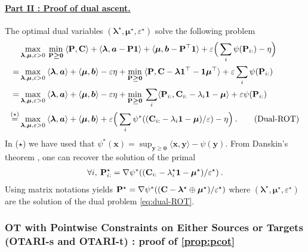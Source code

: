 \paragraph{\underline{Part II : Proof of dual ascent.}}

The optimal dual variables $(\bm{\lambda}^\star, \bm{\mu}^\star, \varepsilon^\star)$ solve the following problem 
\begin{align}
    &\max_{\bm{\lambda}, \bm{\mu}, \varepsilon > 0} \: \min_{{\mathbf{P}} \bm{\geq} \bm{0}} \: \langle {\mathbf{P}}, {\mathbf{C}} \rangle + \langle \bm{\lambda}, \bm{a} - {\mathbf{P}} \bm{1} \rangle + \langle \bm{\mu}, \bm{b} - {\mathbf{P}}^\top \bm{1} \rangle + \varepsilon \Big(\sum_i \psi({\mathbf{P}}_{i:}) - \eta \Big) \\
    = &\max_{\bm{\lambda}, \bm{\mu}, \varepsilon> 0} \: \langle \bm{\lambda}, \bm{a} \rangle + \langle \bm{\mu}, \bm{b} \rangle - \varepsilon \eta + \min_{{\mathbf{P}} \bm{\geq} \bm{0}} \: \langle {\mathbf{P}}, {\mathbf{C}} - \bm{\lambda}\bm{1}^\top - \bm{1}\bm{\mu}^\top \rangle + \varepsilon \sum_i \psi({\mathbf{P}}_{i:}) \\
    = &\max_{\bm{\lambda}, \bm{\mu}, \varepsilon>0} \: \langle \bm{\lambda}, \bm{a} \rangle + \langle \bm{\mu}, \bm{b} \rangle - \varepsilon \eta + \min_{{\mathbf{P}} \bm{\geq} \bm{0}} \: \sum_i \langle {\mathbf{P}}_{i:}, {\mathbf{C}}_{i:} - \lambda_i \bm{1} - \bm{\mu} \rangle + \varepsilon \psi({\mathbf{P}}_{i:}) \\
    \stackrel{(\star)}{=} &\max_{\bm{\lambda}, \bm{\mu}, \varepsilon>0}  \: \langle \bm{\lambda}, \bm{a} \rangle + \langle \bm{\mu}, \bm{b} \rangle + \varepsilon \Big(\sum_i \psi^*(({\mathbf{C}}_{i:} - \lambda_i \bm{1} - \bm{\mu}) / \varepsilon) - \eta \Big) \:.
    \tag{Dual-ROT}
    \label{eq:dual-ROT}
\end{align}
In ($\star$) we have used that $\psi^*(\bm{x}) = \sup_{\bm{y} \bm{\geq} \bm{0}} \langle \bm{x}, \bm{y} \rangle - \psi(\bm{y})$.
From Danskin's theorem \citep{danskin1966theory}, one can recover the solution of the primal
\begin{align}
    \forall i, \: {\mathbf{P}}^\star_{i:} = \nabla \psi^*(({\mathbf{C}}_{i:} - \lambda^\star_i \bm{1} - \bm{\mu}^\star) / \varepsilon^\star) \:.
\end{align}
Using matrix notations yields ${\mathbf{P}}^\star = \nabla \psi^*(({\mathbf{C}} - \bm{\lambda}^\star \oplus \bm{\mu}^\star) / \varepsilon^\star)$
where $(\bm{\lambda}^\star, \bm{\mu}^\star, \varepsilon^\star)$ are the solution of the dual problem \eqref{eq:dual-ROT}.

\subsubsection{OT with Pointwise Constraints on Either Sources or Targets (OTARI-s and OTARI-t) : proof of \cref{prop:pcot}}\label{sec:proofs}

